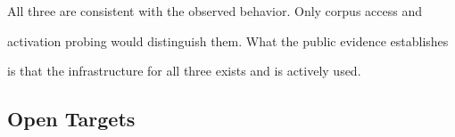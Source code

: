 All three are consistent with the observed behavior. Only corpus access and





activation probing would distinguish them. What the public evidence establishes





is that the infrastructure for all three exists and is actively used.











\subsection{Open Targets}











